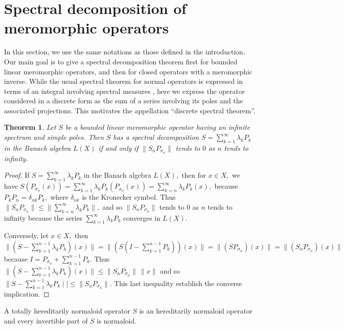 \documentclass[11pt]{article}
\numberwithin{equation}{section} \allowdisplaybreaks
\newtheorem{theorem}{\sc Theorem}[section]
\newcommand{\bet}{\begin{theorem}}
\newcommand{\eet}{\end{theorem}}
\newcommand{\bp}{\begin{proof}}
\newcommand{\ep}{\end{proof}}
\begin{document}
\section{Spectral decomposition  of meromorphic operators}

In this section,  we use  the  same  notations as those defined in
the introduction. Our main goal is   to  give a spectral
decomposition theorem first for bounded linear meromorphic
operators, and then for closed operators with a meromorphic
inverse. While the usual spectral theorem for normal operators is
expressed in terms of an integral involving spectral measures
\cite[Theorem 7.3]{TLY}, here we express the operator considered
in a discrete form as the sum of a series involving its  poles
 and the associated projections. This
motivates the appellation ``discrete spectral theorem''.




\bet \label{decompo} Let $S$ be a  bounded  linear meromorphic
operator having an infinite spectrum and simple poles. Then  $S$
has a spectral decomposition $S = \displaystyle
\sum_{k=1}^{\infty}\lambda_k P_k$ in the Banach algebra $L(X)$ if
and only if $\|S_n P_{\sigma_n}\|$ tends to $0$ as $n$ tends to
infinity.

\eet

\bp   If $ S= \displaystyle \sum_{k=1}^{\infty}\lambda_k P_k$ in
the Banach algebra $L(X),$ then for $ x \in X,$ we have $ S(
P_{\sigma_n}(x))= \displaystyle \sum_{k=1}^{\infty}\lambda_k
P_k(P_{\sigma_n}(x))= \sum_{k=n}^{\infty}\lambda_k P_k(x),$
because $P_kP_n= \delta_{nk}P_k,$   where $ \delta_{nk}$ is the
Kronecker symbol. Thus $\| S_nP_{\sigma_n}\| \leq\|
\sum_{k=n}^{\infty}\lambda_k P_k\|, $ and so  $\|
S_nP_{\sigma_n}\|$  tends to $0$ as $n$ tends to infinity because
the series $ \displaystyle \sum_{k=1}^{\infty}\lambda_k P_k $
converges in $L(X).$

Conversely, let $ x \in X,$ then  $ \|(S- \displaystyle
\sum_{k=1}^{n-1} \lambda_k P_k) (x)\|= \| (S( I- \displaystyle
\sum_{k=1}^{n-1} P_k ))(x) \| = \|(SP_{\sigma_n})(x) \|=
\|(S_nP_{\sigma_n})(x) \|$ because $I= P_{\sigma_n} +
\displaystyle \sum_{k=1}^{n-1} P_k.$ Thus $ \| (S-
\sum_{k=1}^{n-1} \lambda_k P_k) (x)\| \leq \|
S_nP_{\sigma_n}\|\,\| x \|$ and so $\| \displaystyle S-
\sum_{k=1}^{n-1} \lambda_k P_k\mid \mid \leq \| S_n
P_{\sigma_n}\|.$ This last inequality establish the converse
implication. \ep

A totally hereditarily normaloid  operator $S$  is an hereditarily
normaloid operator and every invertible part of $S$ is normaloid.
\end{document}

